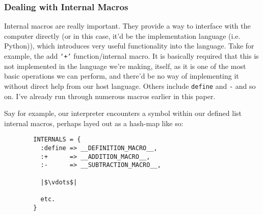 \documentclass{article}
\newcommand{\code}[1]{\texttt{#1}}
\begin{document}
    \subsubsection{Dealing with Internal Macros}
      Internal macros are really important. They provide a way to interface with
      the computer directly (or in this case, it'd be the implementation
      language (i.e. Python)), which introduces very useful functionality into
      the language. Take for example, the add \code{`+'} function/internal macro.
      It is basically required that this is not implemented in the language we're
      making, itself, as it is one of the most basic operations we can perform,
      and there'd be no way of implementing it without direct help from our
      host language. Others include \code{define} and \code{-} and so on.
      I've already run through numerous macros earlier in this paper.

      Say for example, our interpreter encounters a symbol within our defined
      list internal macros, perhaps layed out as a hash-map like so:
      \begin{verbatim}
        INTERNALS = {
          :define => __DEFINITION_MACRO__,
          :+      => __ADDITION_MACRO__,
          :-      => __SUBTRACTION_MACRO__,

          |$\vdots$|

          etc.
        }
      \end{verbatim}
\end{document}
